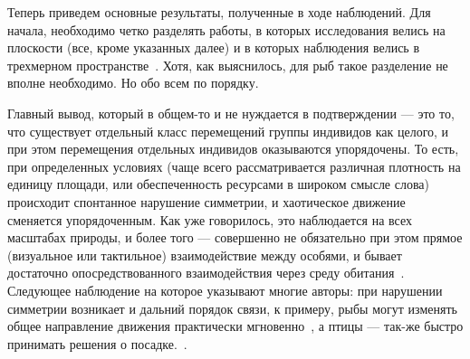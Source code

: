 	Теперь приведем основные результаты, полученные в ходе наблюдений. Для начала, необходимо четко разделять работы, в которых исследования велись на плоскости (все, кроме указанных далее) и в которых наблюдения велись в трехмерном пространстве~\cite{cullen1965,ballerini2008,major1978,makris2009}. Хотя, как выяснилось, для рыб такое разделение не вполне необходимо. Но обо всем по порядку.

	Главный вывод, который в общем-то и не нуждается в подтверждении --- это то, что существует отдельный класс перемещений группы индивидов как целого, и при этом перемещения отдельных индивидов оказываются упорядочены. То есть, при определенных условиях (чаще всего рассматривается различная плотность на единицу площади, или обеспеченность ресурсами в широком смысле слова) происходит спонтанное нарушение симметрии, и хаотическое движение сменяется упорядоченным. Как уже говорилось, это наблюдается на всех масштабах природы, и более того --- совершенно не обязательно при этом прямое (визуальное или тактильное) взаимодействие между особями, и бывает достаточно опосредствованного взаимодействия через среду обитания~\cite[с. 119]{vicsek2012}. %
	Следующее наблюдение на которое указывают многие авторы: при нарушении симметрии возникает и дальний порядок связи, к примеру, рыбы могут изменять общее направление движения практически мгновенно~\cite{cambui2012}, а птицы --- так-же быстро принимать решения о посадке.~\cite{lukeman2010,major1978}.

